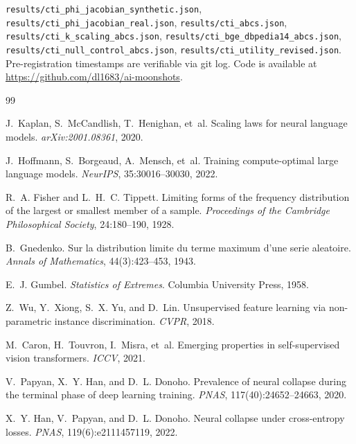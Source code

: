 \documentclass{article}
\begin{document}
\texttt{results/cti\_phi\_jacobian\_synthetic.json}, \texttt{results/cti\_phi\_jacobian\_real.json}, \texttt{results/cti\_abcs.json}, \texttt{results/cti\_k\_scaling\_abcs.json}, \texttt{results/cti\_bge\_dbpedia14\_abcs.json}, \texttt{results/cti\_null\_control\_abcs.json}, \texttt{results/cti\_utility\_revised.json}. Pre-registration timestamps are verifiable via git log. Code is available at \url{https://github.com/dl1683/ai-moonshots}.

\begin{thebibliography}{99}

J.~Kaplan, S.~McCandlish, T.~Henighan, et~al.
\newblock Scaling laws for neural language models.
\newblock \emph{arXiv:2001.08361}, 2020.

J.~Hoffmann, S.~Borgeaud, A.~Mensch, et~al.
\newblock Training compute-optimal large language models.
\newblock \emph{NeurIPS}, 35:30016--30030, 2022.

R.~A. Fisher and L.~H.~C. Tippett.
\newblock Limiting forms of the frequency distribution of the largest or smallest member of a sample.
\newblock \emph{Proceedings of the Cambridge Philosophical Society}, 24:180--190, 1928.

B.~Gnedenko.
\newblock Sur la distribution limite du terme maximum d'une serie aleatoire.
\newblock \emph{Annals of Mathematics}, 44(3):423--453, 1943.

E.~J. Gumbel.
\newblock \emph{Statistics of Extremes}.
\newblock Columbia University Press, 1958.

Z.~Wu, Y.~Xiong, S.~X. Yu, and D.~Lin.
\newblock Unsupervised feature learning via non-parametric instance discrimination.
\newblock \emph{CVPR}, 2018.

M.~Caron, H.~Touvron, I.~Misra, et~al.
\newblock Emerging properties in self-supervised vision transformers.
\newblock \emph{ICCV}, 2021.

V.~Papyan, X.~Y. Han, and D.~L. Donoho.
\newblock Prevalence of neural collapse during the terminal phase of deep learning training.
\newblock \emph{PNAS}, 117(40):24652--24663, 2020.

X.~Y. Han, V.~Papyan, and D.~L. Donoho.
\newblock Neural collapse under cross-entropy losses.
\newblock \emph{PNAS}, 119(6):e2111457119, 2022.


\end{thebibliography}
\end{document}
